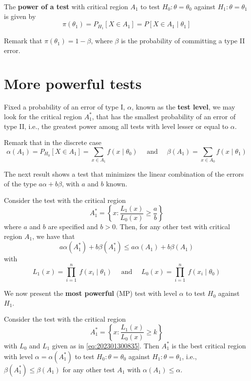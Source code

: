 \documentclass[12pt,a4paper]{report}
\begin{document}
\begin{definition}
    The \textbf{power of a test} with critical region $A_1$ to test $H_0 : \theta = \theta_0$ against $H_1 : \theta = \theta_1$ is given by 
    \begin{equation*}
        \pi(\theta_1) = P_{H_1}[X \in A_1] = P[X \in A_1 \mid \theta_1]
    \end{equation*}
\end{definition}

Remark that $\pi(\theta_1) = 1 - \beta$, where $\beta$ is the probability of committing a type II error.

\section{More powerful tests}

Fixed a probability of an error of type I, $\alpha$, known as the \textbf{test level}, we may look for the critical region $A_1^\ast$, that has the smallest probability of an error of type II, i.e., the greatest power among all tests with level lesser or equal to $\alpha$. 

Remark that in the discrete case
\[
    \alpha(A_1) = P_{H_0}[X \in A_1] = \sum_{x \in A_1} f(x \mid \theta_0) \quad \text{ and } \quad \beta(A_1) = \sum_{x \in A_0} f(x \mid \theta_1)
\]

The next result shows a test that minimizes the linear combination of the errors of the type $a \alpha + b \beta$, with $a$ and $b$ known. 

\begin{lemma}
    Consider the test with the critical region 
    \[
        A_1^\ast = \left\{ x : \frac{L_1(x)}{L_0(x)} \geq \frac{a}{b} \right\}
    \]
    where $a$ and $b$ are specified and $b > 0$. Then, for any other test with critical region $A_1$, we have that 
    \[
        a \alpha(A_1^\ast) + b \beta (A_1^\ast) \leq a \alpha(A_1) + b \beta(A_1)
    \]
    with 
    \begin{equation}\label{eq:202301300835}
        L_1(x) = \prod_{i=1}^{n} ~f(x_i \mid \theta_1)  \quad \text{ and } \quad  L_0(x) = \prod_{i=1}^{n} ~f(x_i \mid \theta_0)
    \end{equation}
\end{lemma}

We now present the \textbf{most powerful} (MP) test with level $\alpha$ to test $H_0$ against $H_1$.

\begin{lemma}
    Consider the test with the critical region 
    \[
        A_1^\ast = \left\{ x : \frac{L_1(x)}{L_0(x)} \geq k \right\}
    \]
    with $L_0$ and $L_1$ given as in \eqref{eq:202301300835}. Then $A_1^\ast$ is the best critical region with level $\alpha = \alpha(A_1^\ast)$ to test $H_0 : \theta = \theta_0$ against $H_1 : \theta = \theta_1$, i.e., $\beta(A_1^\ast) \leq \beta(A_1)$ for any other test $A_1$ with $\alpha(A_1) \leq \alpha$. 
\end{lemma}
\end{document}
